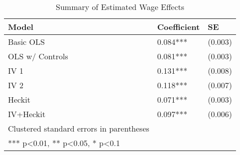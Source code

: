 \documentclass{article}
\begin{document}
\begin{table}[tbp] \centering
{}

\caption{Summary of Estimated Wage Effects}
\begin{tabularx}{\linewidth}{@{}lCC@{}}

\toprule
{Model}&{Coefficient}&{SE} \tabularnewline
\midrule \addlinespace[\belowrulesep]
Basic OLS&0.084***&(0.003) \tabularnewline
OLS w/ Controls&0.081***&(0.003) \tabularnewline
IV 1&0.131***&(0.008) \tabularnewline
IV 2&0.118***&(0.007) \tabularnewline
Heckit&0.071***&(0.003) \tabularnewline
IV+Heckit&0.097***&(0.006) \tabularnewline
\midrule Clustered standard errors in parentheses&& \tabularnewline
*** p<0.01, ** p<0.05, * p<0.1&& \tabularnewline
\bottomrule 

\end{tabularx}
\end{table}
\end{document}
